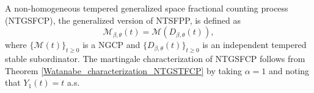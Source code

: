 \documentclass[11pt,oneside,reqno]{amsart}
\theoremstyle{definition}
\newtheorem{theorem}{\bf Theorem}[section]
\newtheorem{corollary}{Corollary}[section]
\theoremstyle{remarkstyle}
\begin{document}
 A non-homogeneous tempered generalized space fractional counting process (NTGSFCP), the generalized version of NTSFPP, is defined as 
\begin{equation}\label{definition_NTGSFCP}
    \mathcal{M}_{\beta,\theta}(t)=\mathcal{M}\left(D_{\beta,\theta}(t)\right),
\end{equation}
where $\{\mathcal{M}(t)\}_{t\ge 0}$ is a NGCP and $\{D_{\beta,\theta}(t)\}_{t\ge 0}$ is an independent tempered stable subordinator. The martingale characterization of NTGSFCP follows from Theorem \ref{Watanabe_characterization_NTGSTFCP} by taking $\alpha=1$ and noting that $Y_1(t)=t$ a.s.
\end{document}
